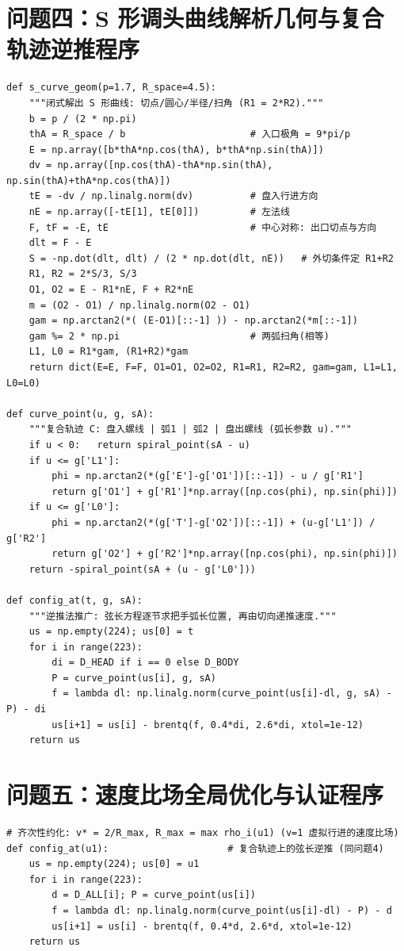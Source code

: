 ﻿\documentclass{cumcmthesis}
\begin{document}
\begin{appendices}
\section{问题四：S 形调头曲线解析几何与复合轨迹逆推程序}
\begin{lstlisting}
def s_curve_geom(p=1.7, R_space=4.5):
    """闭式解出 S 形曲线: 切点/圆心/半径/扫角 (R1 = 2*R2)."""
    b = p / (2 * np.pi)
    thA = R_space / b                      # 入口极角 = 9*pi/p
    E = np.array([b*thA*np.cos(thA), b*thA*np.sin(thA)])
    dv = np.array([np.cos(thA)-thA*np.sin(thA), np.sin(thA)+thA*np.cos(thA)])
    tE = -dv / np.linalg.norm(dv)          # 盘入行进方向
    nE = np.array([-tE[1], tE[0]])         # 左法线
    F, tF = -E, tE                         # 中心对称: 出口切点与方向
    dlt = F - E
    S = -np.dot(dlt, dlt) / (2 * np.dot(dlt, nE))   # 外切条件定 R1+R2
    R1, R2 = 2*S/3, S/3
    O1, O2 = E - R1*nE, F + R2*nE
    m = (O2 - O1) / np.linalg.norm(O2 - O1)
    gam = np.arctan2(*( (E-O1)[::-1] )) - np.arctan2(*m[::-1])
    gam %= 2 * np.pi                       # 两弧扫角(相等)
    L1, L0 = R1*gam, (R1+R2)*gam
    return dict(E=E, F=F, O1=O1, O2=O2, R1=R1, R2=R2, gam=gam, L1=L1, L0=L0)

def curve_point(u, g, sA):
    """复合轨迹 C: 盘入螺线 | 弧1 | 弧2 | 盘出螺线 (弧长参数 u)."""
    if u < 0:   return spiral_point(sA - u)
    if u <= g['L1']:
        phi = np.arctan2(*(g['E']-g['O1'])[::-1]) - u / g['R1']
        return g['O1'] + g['R1']*np.array([np.cos(phi), np.sin(phi)])
    if u <= g['L0']:
        phi = np.arctan2(*(g['T']-g['O2'])[::-1]) + (u-g['L1']) / g['R2']
        return g['O2'] + g['R2']*np.array([np.cos(phi), np.sin(phi)])
    return -spiral_point(sA + (u - g['L0']))

def config_at(t, g, sA):
    """逆推法推广: 弦长方程逐节求把手弧长位置, 再由切向递推速度."""
    us = np.empty(224); us[0] = t
    for i in range(223):
        di = D_HEAD if i == 0 else D_BODY
        P = curve_point(us[i], g, sA)
        f = lambda dl: np.linalg.norm(curve_point(us[i]-dl, g, sA) - P) - di
        us[i+1] = us[i] - brentq(f, 0.4*di, 2.6*di, xtol=1e-12)
    return us
\end{lstlisting}

\section{问题五：速度比场全局优化与认证程序}
\begin{lstlisting}
# 齐次性约化: v* = 2/R_max, R_max = max rho_i(u1) (v=1 虚拟行进的速度比场)
def config_at(u1):                     # 复合轨迹上的弦长逆推 (同问题4)
    us = np.empty(224); us[0] = u1
    for i in range(223):
        d = D_ALL[i]; P = curve_point(us[i])
        f = lambda dl: np.linalg.norm(curve_point(us[i]-dl) - P) - d
        us[i+1] = us[i] - brentq(f, 0.4*d, 2.6*d, xtol=1e-12)
    return us


\end{lstlisting}
\end{appendices}
\end{document}
